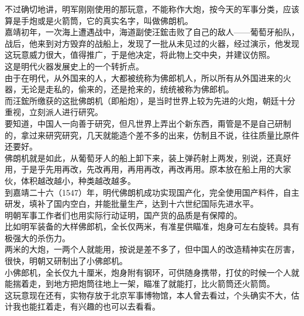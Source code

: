\begin{multicols}{\theparacolNo}
不过确切地讲，明军刚刚使用的那玩意，不能称作大炮，按今天的军事分类，应该算是手炮或是火箭筒，它的真实名字，叫做佛朗机。\\

嘉靖初年，一次海上遭遇战中，海道副使汪鋐击败了自己的敌人——葡萄牙船队，战后，他来到对方毁弃的战船上，发现了一批从未见过的火器，经过演示，他发现这玩意威力很大，值得推广，于是他决定，将此物上交中央，并建议仿照。\\

这是明代火器发展史上的一个转折点。\\

由于在明代，从外国来的人，大都被统称为佛郎机人，所以所有从外国进来的火器，无论是走私的，偷来的，还是抢来的，统统被称为佛郎机。\\

而汪鋐所缴获的这批佛朗机（即船炮），是当时世界上较为先进的火炮，朝廷十分重视，立刻派人进行研究。\\

要知道，中国人一向善于研究，但凡世界上弄出个新东西，甭管是不是自己研制的，拿过来研究研究，几天就能造个差不多的出来，仿制且不说，往往质量比原件还要好。\\

佛朗机就是如此，从葡萄牙人的船上卸下来，装上弹药射上两发，别说，还真好用，于是乎先用再改，先改再用，再用再改，再改再用。原本放在船上用的大家伙，体积越改越小，种类越改越多。\\

到嘉靖二十六（1547）年，明代佛朗机成功实现国产化，完全使用国产料件，自主研发，填补了国内空白，并能批量生产，达到十六世纪国际先进水平。\\

明朝军事工作者们也用实际行动证明，国产货的品质是有保障的。\\

比如明军装备的大样佛郎机，全长仅两米，有准星供瞄准，炮身可左右旋转。具有极强大的杀伤力。\\

两米的大炮，一两个人就能用，按说是差不多了，但中国人的改造精神实在厉害，很快，明朝又研制出了小佛郎机。\\

小佛郎机，全长仅九十厘米，炮身附有钢环，可供随身携带，打仗的时候一个人就能揣着走，到地方把炮筒往地上一架，瞄准了就能打，比火箭筒还火箭筒。\\

这玩意现在还有，实物存放于北京军事博物馆，本人曾去看过，个头确实不大，估计我也能扛着走，有兴趣的也可以去看看。\\


\end{multicols}
